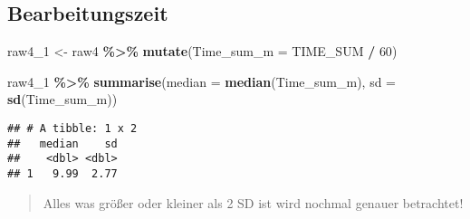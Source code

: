 \documentclass[
]{article}
\newenvironment{Shaded}{\begin{snugshade}}{\end{snugshade}}
\newcommand{\AttributeTok}[1]{\textcolor[rgb]{0.13,0.29,0.53}{#1}}
\newcommand{\DecValTok}[1]{\textcolor[rgb]{0.00,0.00,0.81}{#1}}
\newcommand{\FunctionTok}[1]{\textcolor[rgb]{0.13,0.29,0.53}{\textbf{#1}}}
\newcommand{\NormalTok}[1]{#1}
\newcommand{\OtherTok}[1]{\textcolor[rgb]{0.56,0.35,0.01}{#1}}
\newcommand{\SpecialCharTok}[1]{\textcolor[rgb]{0.81,0.36,0.00}{\textbf{#1}}}
\begin{document}
\begin{Shaded}
\end{Shaded}

\subsection{Bearbeitungszeit}\label{bearbeitungszeit}

\begin{Shaded}
\begin{Highlighting}[]
\NormalTok{raw4\_1 }\OtherTok{\textless{}{-}}\NormalTok{ raw4 }\SpecialCharTok{\%\textgreater{}\%} 
  \FunctionTok{mutate}\NormalTok{(}\AttributeTok{Time\_sum\_m =}\NormalTok{ TIME\_SUM }\SpecialCharTok{/} \DecValTok{60}\NormalTok{)}
\end{Highlighting}
\end{Shaded}

\begin{Shaded}
\begin{Highlighting}[]
\NormalTok{raw4\_1 }\SpecialCharTok{\%\textgreater{}\%} 
  \FunctionTok{summarise}\NormalTok{(}\AttributeTok{median =} \FunctionTok{median}\NormalTok{(Time\_sum\_m),}
            \AttributeTok{sd =} \FunctionTok{sd}\NormalTok{(Time\_sum\_m))}
\end{Highlighting}
\end{Shaded}

\begin{verbatim}
## # A tibble: 1 x 2
##   median    sd
##    <dbl> <dbl>
## 1   9.99  2.77
\end{verbatim}

\begin{quote}
Alles was größer oder kleiner als 2 SD ist wird nochmal genauer
betrachtet!
\end{quote}
\end{document}
